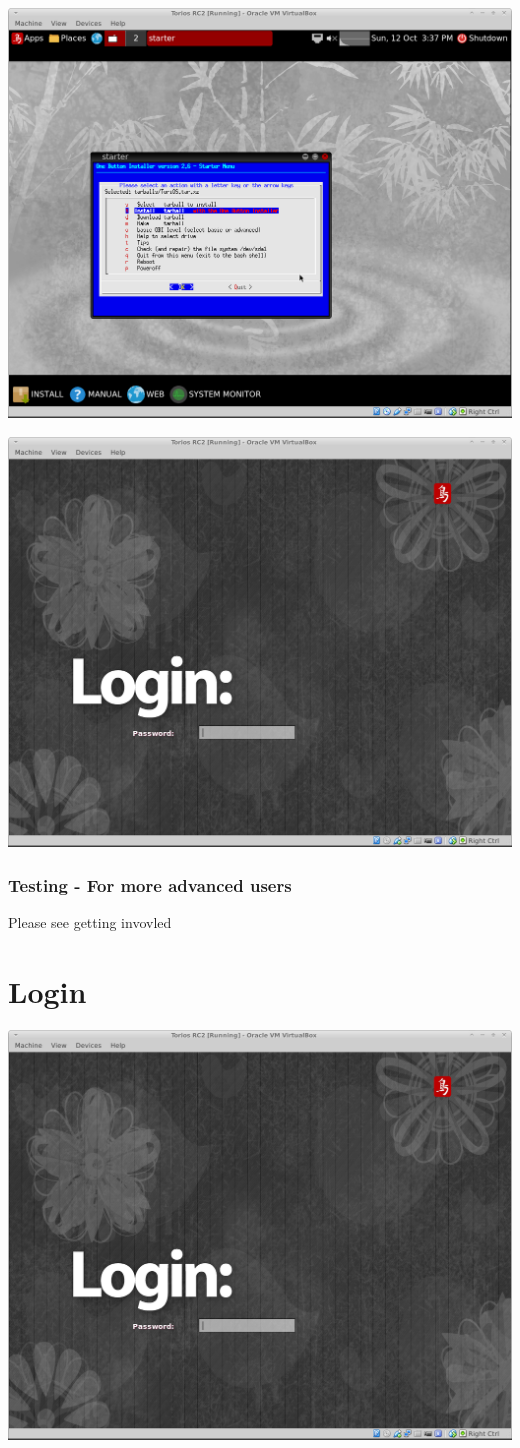 \documentclass[12pt,a4paper]{book}
\begin{document}
\includegraphics[width=0.7\linewidth]{torios-rc2-install9}




\includegraphics[width=0.7\linewidth]{screen-shots/torios-rc2-login-screen}

 
\newpage

\subsection{Testing - For more advanced users}

Please see getting invovled

\chapter{Login}



\includegraphics[width=0.8\linewidth]{screen-shots/torios-rc2-login-screen} \\
\end{document}
